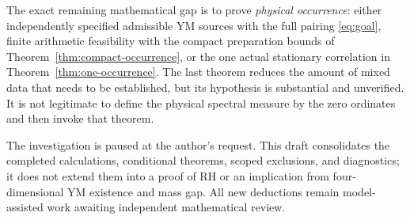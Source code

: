 The exact remaining mathematical gap is to prove
\emph{physical occurrence}: either independently
specified admissible YM sources with the full pairing
\eqref{eq:goal}, finite arithmetic feasibility with
the compact preparation bounds of
Theorem~\ref{thm:compact-occurrence}, or the one actual
stationary correlation in
Theorem~\ref{thm:one-occurrence}.
The last theorem reduces the amount of mixed data
that needs to be established, but its hypothesis is
substantial and unverified. It is not legitimate to
define the physical spectral measure by the zero
ordinates and then invoke that theorem.

The investigation is paused at the author's request.
This draft consolidates the completed calculations,
conditional theorems, scoped exclusions, and diagnostics;
it does not extend them into a proof of RH or an
implication from four-dimensional YM existence and
mass gap. All new deductions remain model-assisted
work awaiting independent mathematical review.
